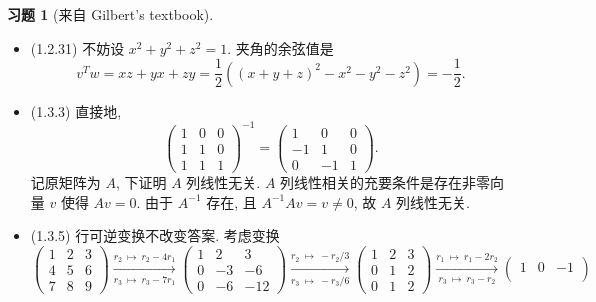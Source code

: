 \documentclass[11pt]{ctexart}
\theoremstyle{definition}
\numberwithin{equation}{section}
\theoremstyle{definition}
\newtheorem*{proposition}{命题}
\newtheorem*{exercise}{习题}
\theoremstyle{remark}
\begin{document}
\begin{exercise}[来自 Gilbert's textbook]
\begin{aaa}
\begin{itemize}
\begin{pinked}
\begin{proposition}
        \end{proposition}
    \end{pinked}
    \item (1.2.31) 不妨设 $x^2+y^2+z^2=1$. 夹角的余弦值是
    \begin{equation}
        v^Tw=xz+yx+zy=\frac{1}{2}((x+y+z)^2-x^2-y^2-z^2)=-\frac{1}{2}. 
    \end{equation}
    \item (1.3.3) 直接地, 
    \begin{equation}
        \begin{pmatrix}
            1 & 0 & 0\\
            1 & 1 & 0\\
            1 & 1 & 1
            \end{pmatrix}^{-1} =\begin{pmatrix}
            1 & 0 & 0\\
            -1 & 1 & 0\\
            0 & -1 & 1
            \end{pmatrix}.
    \end{equation}
    记原矩阵为 $A$, 下证明 $A$ 列线性无关. $A$ 列线性相关的充要条件是存在非零向量 $v$ 使得 $Av=0$. 由于 $A^{-1}$ 存在, 且 $A^{-1}Av=v\neq 0$, 故 $A$ 列线性无关. 
    \item (1.3.5) 行可逆变换不改变答案. 考虑变换
    \begin{equation}
        \begin{pmatrix}
            1 & 2 & 3\\
            4 & 5 & 6\\
            7 & 8 & 9
            \end{pmatrix}\xrightarrow[r_{3} \ \mapsto \ r_{3} -7r_{1}]{r_{2} \ \mapsto \ r_{2} -4r_{1}}\begin{pmatrix}
            1 & 2 & 3\\
            0 & -3 & -6\\
            0 & -6 & -12
            \end{pmatrix}\xrightarrow[r_{3} \ \mapsto \ -r_{3} /6]{r_{2} \ \mapsto \ -r_{2} /3}\begin{pmatrix}
            1 & 2 & 3\\
            0 & 1 & 2\\
            0 & 1 & 2
            \end{pmatrix}\xrightarrow[r_{3} \ \mapsto \ r_{3} -r_{2}]{r_{1} \ \mapsto \ r_{1} -2r_{2}}\begin{pmatrix}
            1 & 0 & -1\\

\end{pmatrix}
\end{equation}
\end{itemize}
\end{aaa}
\end{exercise}
\end{document}
